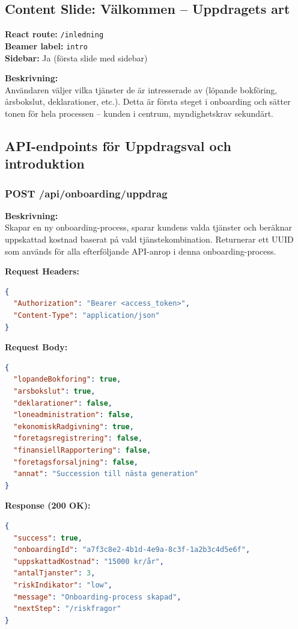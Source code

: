 \documentclass[12pt,a4paper]{article}
\begin{document}
\subsection{Content Slide: Välkommen – Uppdragets art}

\textbf{React route:} \texttt{/inledning}\\
\textbf{Beamer label:} \texttt{intro}\\
\textbf{Sidebar:} Ja (första slide med sidebar)

\textbf{Beskrivning:}\\
Användaren väljer vilka tjänster de är intresserade av (löpande bokföring, årsbokslut, deklarationer, etc.). Detta är första steget i onboarding och sätter tonen för hela processen – kunden i centrum, myndighetskrav sekundärt.

\subsection{API-endpoints för Uppdragsval och introduktion}

\subsubsection{POST /api/onboarding/uppdrag}

\textbf{Beskrivning:}\\
Skapar en ny onboarding-process, sparar kundens valda tjänster och beräknar uppskattad kostnad baserat på vald tjänstekombination. Returnerar ett UUID som används för alla efterföljande API-anrop i denna onboarding-process.

\textbf{Request Headers:}
\begin{lstlisting}[language=json]
{
  "Authorization": "Bearer <access_token>",
  "Content-Type": "application/json"
}
\end{lstlisting}

\textbf{Request Body:}
\begin{lstlisting}[language=json]
{
  "lopandeBokforing": true,
  "arsbokslut": true,
  "deklarationer": false,
  "loneadministration": false,
  "ekonomiskRadgivning": true,
  "foretagsregistrering": false,
  "finansiellRapportering": false,
  "foretagsforsaljning": false,
  "annat": "Succession till nästa generation"
}
\end{lstlisting}

\textbf{Response (200 OK):}
\begin{lstlisting}[language=json]
{
  "success": true,
  "onboardingId": "a7f3c8e2-4b1d-4e9a-8c3f-1a2b3c4d5e6f",
  "uppskattadKostnad": "15000 kr/år",
  "antalTjanster": 3,
  "riskIndikator": "low",
  "message": "Onboarding-process skapad",
  "nextStep": "/riskfragor"
}
\end{lstlisting}
\end{document}
